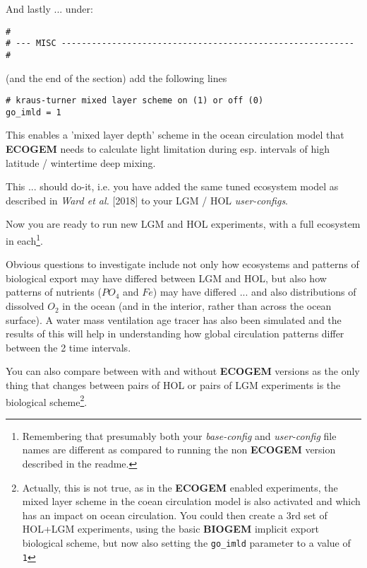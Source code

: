 \documentclass[11pt,fleqn]{book} %
\begin{document}
\begin{enumerate}[noitemsep]
And lastly ... under:
\footnotesize\begin{verbatim}
#
# --- MISC ----------------------------------------------------------
#
\end{verbatim}\normalsize

(and the end of the section) add the following lines
\vspace{-1mm}\begin{verbatim}
# kraus-turner mixed layer scheme on (1) or off (0)
go_imld = 1
\end{verbatim}\vspace{-1mm}
This enables a 'mixed layer depth' scheme in the ocean circulation model that \textbf{ECOGEM} needs to calculate light limitation during esp. intervals of high latitude / wintertime deep mixing.

This ... should do-it, i.e. you have added the same tuned ecosystem model as described in \textit{Ward et al.} [2018] to your LGM / HOL \textit{user-configs}.

\end{enumerate}

\vspace{1mm}

Now you are ready to run new LGM and HOL experiments, with a full ecosystem in each\footnote{Remembering that presumably both your \textit{base-config} and \textit{user-config} file names are  different as compared to running the non \textbf{ECOGEM} version described in the \textsf{\footnotesize readme}.}. 
\vspace{1mm}

Obvious questions to investigate include not only how ecosystems and patterns of biological export may have differed between LGM and HOL, but also how patterns of nutrients (\(PO_{4}\) and \(Fe\)) may have differed ... and also distributions of dissolved \(O_{2}\) in the ocean (and in the interior, rather than across the ocean surface). A water mass ventilation age tracer has also been simulated and the results of this will help in understanding how global circulation patterns differ between the 2 time intervals. 

You can also compare between with and without \textbf{ECOGEM} versions as the only thing that changes between pairs of HOL or pairs of LGM experiments is the biological scheme\footnote{Actually, this is not true, as in the \textbf{ECOGEM} enabled experiments, the mixed layer scheme in the coean circulation model is also activated and which has an impact on ocean circulation. You could then create a 3rd set of HOL+LGM experiments, using the basic \textbf{BIOGEM} implicit export biological scheme, but now also setting the \texttt{go\_imld} parameter to a value of \texttt{1}}.
\end{document}
